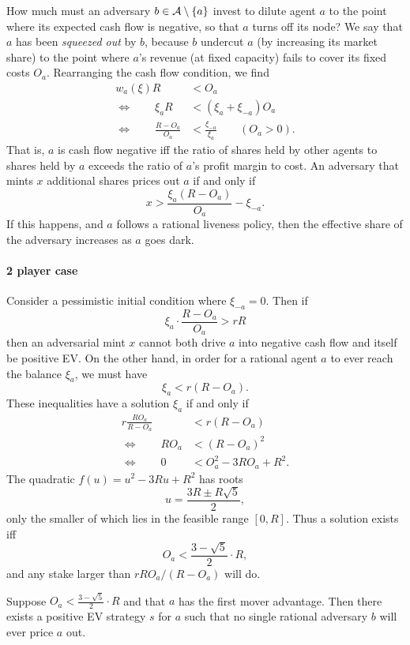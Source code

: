 How much must an adversary $b\in\mathcal{A}\setminus\{a\}$ invest to dilute agent $a$ to the point where its expected cash flow is negative, so that $a$ turns off its node?
%
We say that $a$ has been \emph{squeezed out} by $b$, because $b$ undercut $a$ (by increasing its market share) to the point where $a$'s revenue (at fixed capacity) fails to cover its fixed costs $O_a$.
%
Rearranging the cash flow condition, we find
\begin{align*}
  w_a(\xi) R &< O_a \\
  \Leftrightarrow \qquad \xi_a R &< (\xi_a+\xi_{-a})O_a \\
  \Leftrightarrow \qquad \frac { R-O_a } {O_a} &< \frac{\xi_{-a}}{\xi_a} \qquad (O_a>0).
\end{align*}
That is, $a$ is cash flow negative iff the ratio of shares held by other agents to shares held by $a$ exceeds the ratio of $a$'s profit margin to cost.
%
An adversary that mints $x$ additional shares prices out $a$ if and only if
\[
  x > \frac { \xi_a(R-O_a) } {O_a} - \xi_{-a}.
\]
If this happens, and $a$ follows a rational liveness policy, then the effective share of the adversary increases as $a$ goes dark.

\paragraph{2 player case}
Consider a pessimistic initial condition where $\xi_{-a}=0$.
%
Then if
\[
  \xi_a\cdot\frac{R-O_a}{O_a} > rR
\]
then an adversarial mint $x$ cannot both drive $a$ into negative cash flow and itself be positive EV.
%
On the other hand, in order for a rational agent $a$ to ever reach the balance $\xi_a$, we must have
\[
  \xi_a< r(R-O_a).
\]
These inequalities have a solution $\xi_a$ if and only if
\begin{align*}
  r\frac{RO_a} {R-O_a} &< r(R-O_a) \\
  \Leftrightarrow \qquad RO_a &< (R-O_a)^2  \\
  \Leftrightarrow \qquad 0 &< O_a^2 - 3RO_a + R^2.
\end{align*}
The quadratic $f(u) = u^2 - 3Ru + R^2$ has roots
\[
  u = \frac{3R \pm R\sqrt{5}} {2},
\]
only the smaller of which lies in the feasible range $[0,R]$.
%
Thus a solution exists iff
\[
  O_a < \frac{3-\sqrt {5}}{2} \cdot R,
\]
and any stake larger than $rRO_a/(R-O_a)$ will do.

\begin{proposition*}
  
  Suppose $O_a< \frac{3-\sqrt {5}}{2} \cdot R$ and that $a$ has the first mover advantage.
  Then there exists a positive EV strategy $s$ for $a$ such that no single rational adversary $b$ will ever price $a$ out.

\end{proposition*}



